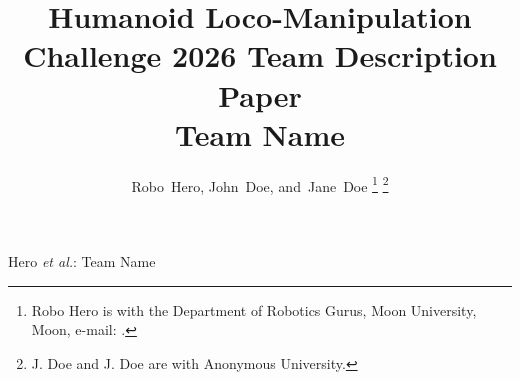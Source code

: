 \documentclass[journal]{IEEEtran}
\begin{document}
%
\title{Humanoid Loco-Manipulation Challenge 2026 Team Description Paper \\
 Team Name}

%
%

\author{Robo~Hero,
        John~Doe,
        and~Jane~Doe%
\thanks{Robo Hero is with the Department
of Robotics Gurus, Moon University, Moon, e-mail: .}%
\thanks{J. Doe and J. Doe are with Anonymous University.}%
}


% 
%



%
{Hero \MakeLowercase{\textit{et al.}}: Team Name}
% 
\end{document}
